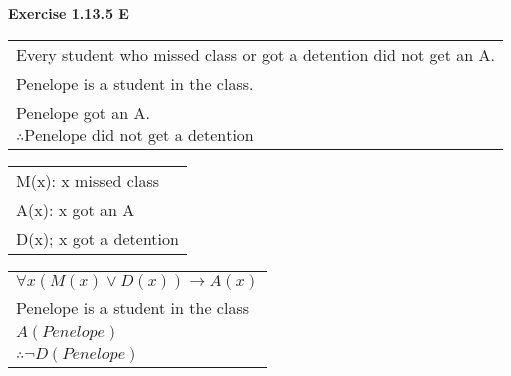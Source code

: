 \documentclass[11pt]{article}
\begin{document}
\noindent \textbf{Exercise 1.13.5 E}
\begin{center}
  \begin{tabular}{l}
  Every student who missed class or got a detention did not get an A.\\
  Penelope is a student in the class.\\
  Penelope got an A.\\
   \hline
  $ \therefore \text{Penelope did not get a detention}$
 \end{tabular}
\end{center}

  \begin{center}
\begin{tabular}{l}

M(x): x missed class\\
A(x): x got an A\\
D(x); x got a detention\\
\end{tabular}
\end{center}

\begin{center}
\begin{tabular}{l}
$\forall x (M(x) \vee D(x)) \rightarrow A(x)$\\
Penelope is a student in the class\\
$A(Penelope)$\\
\hline
$\therefore \neg D(Penelope)$\\
\end{tabular}
\end{center}
\end{document}
